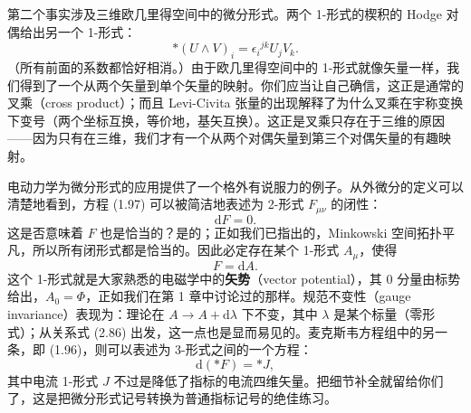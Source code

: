 第二个事实涉及三维欧几里得空间中的微分形式。两个 1-形式的楔积的 Hodge 对偶给出另一个 1-形式：
\begin{equation*}
*(U\wedge V)_{i}=\epsilon_{i}{}^{jk}U_{j}V_{k}. \tag{2.84}
\end{equation*}
（所有前面的系数都恰好相消。）由于欧几里得空间中的 1-形式就像矢量一样，我们得到了一个从两个矢量到单个矢量的映射。你们应当让自己确信，这正是通常的叉乘（cross product）；而且 Levi-Civita 张量的出现解释了为什么叉乘在宇称变换下变号（两个坐标互换，等价地，基矢互换）。这正是叉乘只存在于三维的原因——因为只有在三维，我们才有一个从两个对偶矢量到第三个对偶矢量的有趣映射。

电动力学为微分形式的应用提供了一个格外有说服力的例子。从外微分的定义可以清楚地看到，方程 (1.97) 可以被简洁地表述为 2-形式 $F_{\mu\nu}$ 的闭性：
\begin{equation*}
\mathrm{d}F=0. \tag{2.85}
\end{equation*}
这是否意味着 $F$ 也是恰当的？是的；正如我们已指出的，Minkowski 空间拓扑平凡，所以所有闭形式都是恰当的。因此必定存在某个 1-形式 $A_{\mu}$，使得
\begin{equation*}
F=\mathrm{d}A. \tag{2.86}
\end{equation*}
这个 1-形式就是大家熟悉的电磁学中的\textbf{矢势}（vector potential），其 0 分量由标势给出，$A_{0}=\Phi$，正如我们在第 1 章中讨论过的那样。规范不变性（gauge invariance）表现为：理论在 $A\to A+\mathrm{d}\lambda$ 下不变，其中 $\lambda$ 是某个标量（零形式）；从关系式 (2.86) 出发，这一点也是显而易见的。麦克斯韦方程组中的另一条，即 (1.96)，则可以表述为 3-形式之间的一个方程：
\begin{equation*}
\mathrm{d}(*F)=*J, \tag{2.87}
\end{equation*}
其中电流 1-形式 $J$ 不过是降低了指标的电流四维矢量。把细节补全就留给你们了，这是把微分形式记号转换为普通指标记号的绝佳练习。

